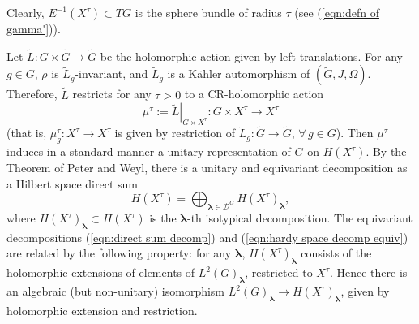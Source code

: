 \documentclass[12pt,a4paper]{article}
\theoremstyle{plain}
\theoremstyle{definition}
\begin{document}
Clearly, $E^{-1}(X^\tau)\subset TG$ 
is the sphere bundle of radius $\tau$ (see (\ref{eqn:defn of gamma'})). 



Let
$\tilde{L}:G\times \tilde{G}\rightarrow \tilde{G}$ 
be the holomorphic action 
given by left translations. For any $g\in G$,
$\rho$ is 
$\tilde{L}_g$-invariant, and
$\tilde{L}_g$ is a K\"{a}hler automorphism of $(\tilde{G},J,\Omega)$.
% 
Therefore, 
$\tilde{L}$ restricts for any $\tau>0$ 
to a CR-holomorphic action 
\begin{equation}
\label{eqn:mutau defn}
\mu^\tau:=
\left.\tilde{L}\right|_{G\times X^\tau}:
G\times X^\tau
\rightarrow X^\tau
\end{equation}
%
(that is, $\mu^\tau_g:X^\tau\rightarrow X^\tau$
is given by restriction of 
$\tilde{L}_g:\tilde{G}\rightarrow \tilde{G}$,
$\forall\,g\in G$).
Then $\mu^\tau$ induces 
in a standard manner
a unitary
representation of $G$ on $H(X^\tau)$. By the Theorem
of Peter and Weyl, 
there is 
a unitary and equivariant decomposition as a Hilbert
space direct sum
\begin{equation}
\label{eqn:hardy space decomp equiv}
H(X^\tau)=\bigoplus_{\boldsymbol{\lambda}\in \mathcal{D}^G}
H(X^\tau)_{\boldsymbol{\lambda}},
\end{equation}
where $H(X^\tau)_{\boldsymbol{\lambda}}\subset
H(X^\tau)$ is the $\boldsymbol{\lambda}$-th isotypical
decomposition. 
The equivariant 
decompositions (\ref{eqn:direct sum decomp}) and  (\ref{eqn:hardy space decomp equiv})
are related by the following property:
for any $\boldsymbol{\lambda}$,
$H(X^\tau)_{\boldsymbol{\lambda}}$ consists of the
holomorphic extensions of elements of $L^2(G)_{\boldsymbol{\lambda}}$,
restricted to $X^\tau$. Hence there is an algebraic
(but non-unitary)
isomorphism $L^2(G)_{\boldsymbol{\lambda}}\rightarrow 
H(X^\tau)_{\boldsymbol{\lambda}}$, given by holomorphic extension and restriction.
\end{document}
